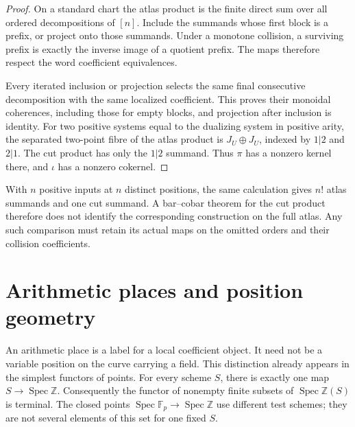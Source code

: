 \begin{proof}
On a standard chart the atlas product is the finite direct sum
over all ordered decompositions of \([n]\). Include the summands
whose first block is a prefix, or project onto those summands.
Under a monotone collision, a surviving prefix is exactly the
inverse image of a quotient prefix. The maps therefore respect
the word coefficient equivalences.

Every iterated inclusion or projection selects the same final
consecutive decomposition with the same localized coefficient.
This proves their monoidal coherences, including those for empty
blocks, and projection after inclusion is identity. For two
positive systems equal to the dualizing system in positive arity,
the separated two-point fibre of the atlas product is
\(J_U\oplus J_U\), indexed by \(1|2\) and \(2|1\).
The cut product has only the \(1|2\) summand. Thus \(\pi\)
has a nonzero kernel there, and \(\iota\) has a nonzero
cokernel.
\end{proof}

With \(n\) positive inputs at \(n\) distinct positions, the
same calculation gives \(n!\) atlas summands and one cut
summand. A bar--cobar theorem for the cut product therefore does
not identify the corresponding construction on the full atlas.
Any such comparison must retain its actual maps on the omitted
orders and their collision coefficients.

\section{Arithmetic places and position geometry}
\label{v4-sec:word-arithmetic-positions}

An arithmetic place is a label for a local coefficient object.
It need not be a variable position on the curve carrying a field.
This distinction already appears in the simplest functors of points.
For every scheme \(S\), there is exactly one map
\(S\to\operatorname{Spec}\mathbb Z\). Consequently the functor
of nonempty finite subsets of
\(\operatorname{Spec}\mathbb Z(S)\) is terminal. The closed
points \(\operatorname{Spec}\mathbb F_p\to\operatorname{Spec}\mathbb Z\)
use different test schemes; they are not several elements of this
set for one fixed \(S\).

